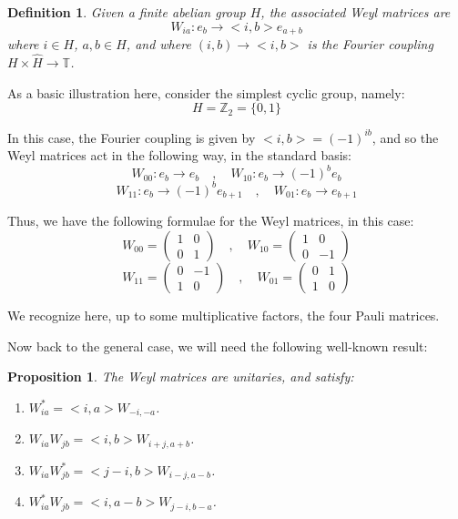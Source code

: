 \documentclass[12pt]{amsbook}
\newtheorem{definition}[theorem]{Definition}
\newtheorem{proposition}[theorem]{Proposition}
\begin{document}

\begin{definition}
Given a finite abelian group $H$, the associated Weyl matrices are
$$W_{ia}:e_b\to<i,b>e_{a+b}$$
where $i\in H$, $a,b\in\widehat{H}$, and where $(i,b)\to<i,b>$ is the Fourier coupling $H\times\widehat{H}\to\mathbb T$.
\end{definition}

As a basic illustration here, consider the simplest cyclic group, namely:
$$H=\mathbb Z_2=\{0,1\}$$

In this case, the Fourier coupling is given by $<i,b>=(-1)^{ib}$, and so the Weyl matrices act in the following way, in the standard basis:
$$W_{00}:e_b\to e_b\quad,\quad 
W_{10}:e_b\to(-1)^be_b$$
$$W_{11}:e_b\to(-1)^be_{b+1}\quad,\quad 
W_{01}:e_b\to e_{b+1}$$

Thus, we have the following formulae for the Weyl matrices, in this case:
$$W_{00}=\begin{pmatrix}1&0\\0&1\end{pmatrix}\quad,\quad 
W_{10}=\begin{pmatrix}1&0\\0&-1\end{pmatrix}$$
$$W_{11}=\begin{pmatrix}0&-1\\1&0\end{pmatrix}\quad,\quad
W_{01}=\begin{pmatrix}0&1\\1&0\end{pmatrix}$$

We recognize here, up to some multiplicative factors, the four Pauli matrices. 

\bigskip

Now back to the general case, we will need the following well-known result:

\begin{proposition}
The Weyl matrices are unitaries, and satisfy:
\begin{enumerate}
\item $W_{ia}^*=<i,a>W_{-i,-a}$.

\item $W_{ia}W_{jb}=<i,b>W_{i+j,a+b}$.

\item $W_{ia}W_{jb}^*=<j-i,b>W_{i-j,a-b}$.

\item $W_{ia}^*W_{jb}=<i,a-b>W_{j-i,b-a}$.
\end{enumerate}
\end{proposition}
\end{document}
